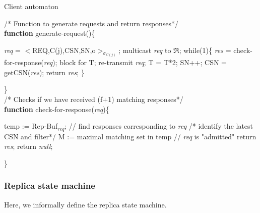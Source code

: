 \documentclass[twocolumn,10pt]{article}
\begin{document}
{\begin{algorithm}
\caption{Client automaton}
/* Function to generate requests and return responses*/\\
\textbf{function} generate-request()\{
\begin{algorithmic}[1]\label{alg:client_req}
\STATE \textit{req} = $<$REQ,C(j),CSN,SN,o$>_{\sigma_{C(j)}}$;
\STATE multicast \textit{req} to $\Re$;
\STATE while(1)\{
\STATE \textit{res} = check-for-response(\textit{req});
\STATE block for T;
\STATE re-transmit \textit{req};
\STATE T = T*2;
\ELSE
\STATE SN++;
\STATE CSN = getCSN(\textit{res});
\STATE return \textit{res};
\ENDIF
\STATE \}
\end{algorithmic}
\}\\
/* Checks if we have received (f+1) matching responses*/\\
\textbf{function} check-for-response(\textit{req})\{
\begin{algorithmic}[1]\label{alg:client_wait_for_res}
\STATE temp := Rep-Buf$_{\textit{req}}$;
\STATE // find responses corresponding to \textit{req}
\STATE /* identify the latest CSN and filter*/
\STATE M := maximal matching set in temp
\STATE // \textit{req} is "admitted"
\STATE return \textit{res};
\ELSE
\STATE return \textit{null};
\ENDIF
\ENDIF
\end{algorithmic}
\}\\
\end{algorithm}


\subsubsection{Replica state machine}
Here, we informally define the replica state machine. 

}
\end{document}
